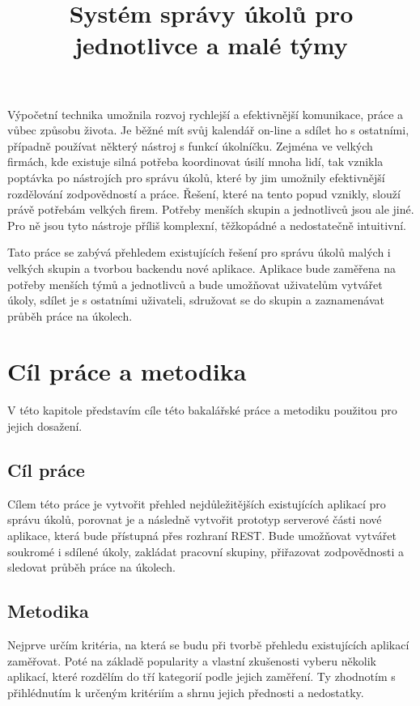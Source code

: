 \documentclass[thesis=B,czech]{FITthesis}[2012/06/26]
\title{Systém správy úkolů pro jednotlivce a malé týmy}
\begin{document}
\begin{introduction}
	Výpočetní technika umožnila rozvoj rychlejší a efektivnější komunikace, práce a vůbec způsobu života. Je běžné mít svůj kalendář on-line a sdílet ho s ostatními, případně používat některý nástroj s funkcí úkolníčku. Zejména ve velkých firmách, kde existuje silná potřeba koordinovat úsilí mnoha lidí, tak vznikla poptávka po nástrojích pro správu úkolů, které by jim umožnily efektivnější rozdělování zodpovědností a práce. Řešení, které na tento popud vznikly, slouží právě potřebám velkých firem. Potřeby menších skupin a jednotlivců jsou ale jiné. Pro ně jsou tyto nástroje příliš komplexní, těžkopádné a nedostatečně intuitivní.

	Tato práce se zabývá přehledem existujících řešení pro správu úkolů malých i velkých skupin a tvorbou backendu nové aplikace. Aplikace bude zaměřena na potřeby menších týmů a jednotlivců a bude umožňovat uživatelům vytvářet úkoly, sdílet je s ostatními uživateli, sdružovat se do skupin a zaznamenávat průběh práce na úkolech. 
\end{introduction}

\chapter{Cíl práce a metodika}
	V této kapitole představím cíle této bakalářské práce a metodiku použitou pro jejich dosažení.
	\section{Cíl práce}
		Cílem této práce je vytvořit přehled nejdůležitějších existujících aplikací pro správu úkolů, porovnat je a následně vytvořit prototyp serverové části nové aplikace, která bude přístupná přes rozhraní REST. Bude umožňovat vytvářet soukromé i sdílené úkoly, zakládat pracovní skupiny, přiřazovat zodpovědnosti a sledovat průběh práce na úkolech. 
		
	\section{Metodika}
		Nejprve určím kritéria, na která se budu při tvorbě přehledu existujících aplikací zaměřovat. Poté na základě popularity a vlastní zkušenosti vyberu několik aplikací, které rozdělím do tří kategorií podle jejich zaměření. Ty zhodnotím s přihlédnutím k určeným kritériím a shrnu jejich přednosti a nedostatky.
		
\end{document}

